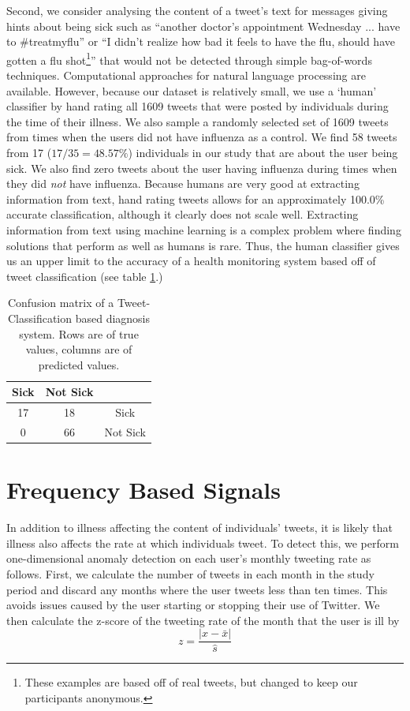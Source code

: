 \documentclass{acm_proc_article-sp}
\begin{document}
Second, we consider analysing the content of a tweet's text for messages giving hints about being sick such as ``another doctor's appointment Wednesday ... have to \#treatmyflu'' or ``I didn't realize how bad it feels to have the flu, should have gotten a flu shot\footnote{These examples are based off of real tweets, but changed to keep our participants anonymous.}'' that would not be detected through simple bag-of-words techniques. Computational approaches for natural language processing are available. However, because our dataset is relatively small, we use a `human' classifier by hand rating all 1609 tweets that were posted by individuals during the time of their illness. We also sample a randomly selected set of 1609 tweets from times when the users did not have influenza as a control. We find 58 tweets from 17 (\(17/35 = 48.57\%\))  individuals in our study that are about the user being sick. We also find zero tweets about the user having influenza during times when they did \emph{not} have influenza. Because humans are very good at extracting information from text, hand rating tweets allows for an approximately 100.0\% accurate classification, although it clearly does not scale well. Extracting information from text using machine learning is a complex problem where finding solutions that perform as well as humans is rare. Thus, the human classifier gives us an upper limit to the accuracy of a health monitoring system based off of tweet classification (see table \ref{tab:tweet_classified_confusion}.)


%


\begin{table}
\centering
\begin{tabular}{|c|c|c|} \hline
Sick&Not Sick&\ \\ \hline
17 & 18 & Sick\\ \hline
0 & 66  & Not Sick\\
\hline\end{tabular}
\caption{Confusion matrix of a Tweet-Classification based diagnosis system. Rows are of true values, columns are of predicted values.}
\label{tab:tweet_classified_confusion}
\end{table}

\section{Frequency Based Signals}

In addition to illness affecting the content of individuals' tweets, it is likely that illness also affects the rate at which individuals tweet. To detect this, we perform one-dimensional anomaly detection on each user's monthly tweeting rate as follows. First, we calculate the number of tweets in each month in the study period and discard any months where the user tweets less than ten times. This avoids issues caused by the user starting or stopping their use of Twitter. We then calculate the z-score of the tweeting rate of the month that the user is ill by
\begin{equation}
z = \frac{|x - \bar{x}|}{\hat{s}}
\end{equation}
\end{document}
